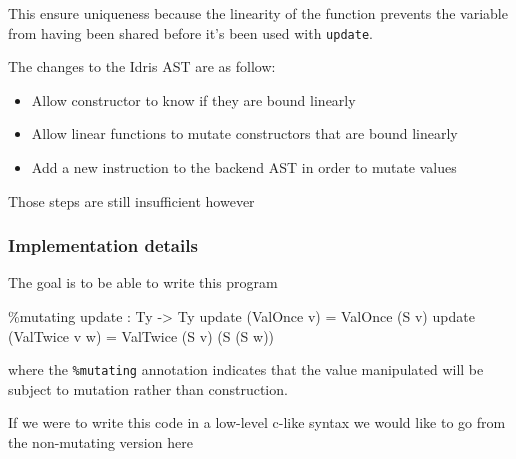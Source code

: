 \documentclass[
]{article}
\newenvironment{Shaded}{}{}
\newcommand{\DataTypeTok}[1]{\textcolor[rgb]{0.56,0.13,0.00}{#1}}
\newcommand{\NormalTok}[1]{#1}
\newcommand{\OperatorTok}[1]{\textcolor[rgb]{0.40,0.40,0.40}{#1}}
\newcommand{\OtherTok}[1]{\textcolor[rgb]{0.00,0.44,0.13}{#1}}
\providecommand{\tightlist}{%
  \setlength{\itemsep}{0pt}\setlength{\parskip}{0pt}}
\begin{document}
This ensure uniqueness because the linearity of the function prevents
the variable from having been shared before it's been used with
\texttt{update}.

The changes to the Idris AST are as follow:

\begin{itemize}
\tightlist
\item
  Allow constructor to know if they are bound linearly
\item
  Allow linear functions to mutate constructors that are bound linearly
\item
  Add a new instruction to the backend AST in order to mutate values
\end{itemize}

Those steps are still insufficient however

\hypertarget{implementation-details}{%
\subsubsection{Implementation details}\label{implementation-details}}

The goal is to be able to write this program

\begin{Shaded}
\begin{Highlighting}[]
\OperatorTok{\%}\NormalTok{mutating}
\NormalTok{update }\OperatorTok{:} \DataTypeTok{Ty} \OtherTok{{-}\textgreater{}} \DataTypeTok{Ty}
\NormalTok{update (}\DataTypeTok{ValOnce}\NormalTok{ v) }\OtherTok{=} \DataTypeTok{ValOnce}\NormalTok{ (}\DataTypeTok{S}\NormalTok{ v)}
\NormalTok{update (}\DataTypeTok{ValTwice}\NormalTok{ v w) }\OtherTok{=} \DataTypeTok{ValTwice}\NormalTok{ (}\DataTypeTok{S}\NormalTok{ v) (}\DataTypeTok{S}\NormalTok{ (}\DataTypeTok{S}\NormalTok{ w))}
\end{Highlighting}
\end{Shaded}

where the \texttt{\%mutating} annotation indicates that the value
manipulated will be subject to mutation rather than construction.

If we were to write this code in a low-level c-like syntax we would like
to go from the non-mutating version here
\end{document}
